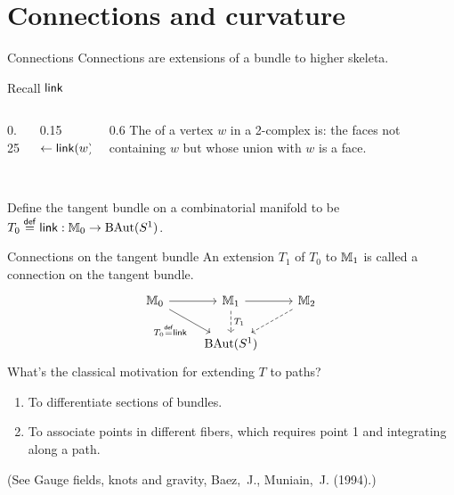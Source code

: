 \section{Connections and curvature}

\begin{frame}{Connections}
Connections are extensions of a bundle to higher skeleta.
\end{frame}

\begin{frame}{Recall \( \operatorname{\mathsf{link}} \)}
\begin{columns}
\begin{column}{0.25\textwidth}

\end{column}
\begin{column}{0.15\textwidth}
\( \leftarrow\operatorname{\mathsf{link}}(w) \)
\end{column}
\begin{column}{0.6\textwidth}
The  of a vertex \( w \) in a 2-complex is: the faces not containing \( w \) but whose union with \( w \) is a face.\\~\\
\end{column}
\end{columns}
Define \alert{the tangent bundle} on a combinatorial manifold to be \( T_0\stackrel{\mathsf{def}}{=}\operatorname{\mathsf{link}}:\mathbb{M}_0\to\operatorname{BAut}(S^1) \).
\end{frame}

\begin{frame}{Connections on the tangent bundle}
An extension \( T_1 \) of \( T_0 \) to \( \mathbb{M}_1 \) is called \alert{a connection on the tangent bundle}.
\[\begin{tikzcd}[ampersand replacement=\&]
  {\mm_0} \& {\mm_1} \& {\mm_2} \\
  \& {\BAut(S^1)}
  \arrow[from=1-1, to=1-2]
  \arrow["{T_0\defeq\link}"', from=1-1, to=2-2]
  \arrow[from=1-2, to=1-3]
  \arrow["{T_1}", dashed, from=1-2, to=2-2]
  \arrow[dashed, from=1-3, to=2-2]
\end{tikzcd}\]
What's the classical motivation for extending \( T \) to paths?
\begin{enumerate}
\item To differentiate sections of bundles.
\item To associate points in different fibers, which requires point 1 and integrating along a path.
\end{enumerate}
(See \alert{Gauge fields, knots and gravity}, Baez,~J., Muniain,~J. (1994).)
\end{frame}

